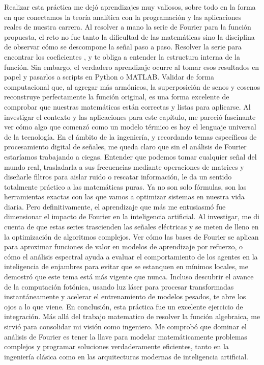 Realizar esta práctica me dejó aprendizajes muy valiosos, sobre todo en la forma en que conectamos la teoría analítica con la programación y las aplicaciones reales de nuestra carrera. Al resolver a mano la serie de Fourier para la función propuesta, el reto no fue tanto la dificultad de las matemáticas sino la disciplina de observar cómo se descompone la señal paso a paso. Resolver la serie para encontrar los coeficientes ,  y  te obliga a entender la estructura interna de la función. Sin embargo, el verdadero aprendizaje ocurre al tomar esos resultados en papel y pasarlos a scripts en Python o MATLAB. Validar de forma computacional que, al agregar más armónicos, la superposición de senos y cosenos reconstruye perfectamente la función original, es una forma excelente de comprobar que nuestras matemáticas están correctas y listas para aplicarse.
Al investigar el contexto y las aplicaciones para este capítulo, me pareció fascinante ver cómo algo que comenzó como un modelo térmico es hoy el lenguaje universal de la tecnología. En el ámbito de la ingeniería, y recordando temas específicos de procesamiento digital de señales, me queda claro que sin el análisis de Fourier estaríamos trabajando a ciegas. Entender que podemos tomar cualquier señal del mundo real, trasladarla a sus frecuencias mediante operaciones de matrices y diseñarle filtros para aislar ruido o rescatar información, le da un sentido totalmente práctico a las matemáticas puras. Ya no son solo fórmulas, son las herramientas exactas con las que vamos a optimizar sistemas en nuestra vida diaria.
Pero definitivamente, el aprendizaje que más me entusiasmó fue dimensionar el impacto de Fourier en la inteligencia artificial. Al investigar, me di cuenta de que estas series trascienden las señales eléctricas y se meten de lleno en la optimización de algoritmos complejos. Ver cómo las bases de Fourier se aplican para aproximar funciones de valor en modelos de aprendizaje por refuerzo, o cómo el análisis espectral ayuda a evaluar el comportamiento de los agentes en la inteligencia de enjambres para evitar que se estanquen en mínimos locales, me demostró que este tema está más vigente que nunca. Incluso descubrir el avance de la computación fotónica, usando luz láser para procesar transformadas instantáneamente y acelerar el entrenamiento de modelos pesados, te abre los ojos a lo que viene.
En conclusión, esta práctica fue un excelente ejercicio de integración. Más allá del trabajo matematico de resolver la función algebraica, me sirvió para consolidar mi visión como ingeniero. Me comprobó que dominar el análisis de Fourier es tener la llave para modelar matemáticamente problemas complejos y programar soluciones verdaderamente eficientes, tanto en la ingeniería clásica como en las arquitecturas modernas de inteligencia artificial.

